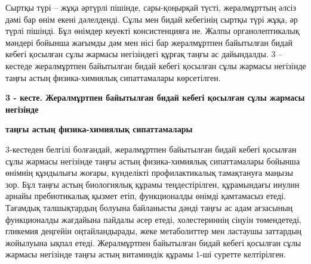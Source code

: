 Сыртқы түрі -- жұқа әртүрлі пішінде, сары-қоңырқай түсті, жералмұрттың
әлсіз дәмі бар өнім екені дәлелденді. Сұлы мен бидай кебегінің сыртқы
түрі жұқа, әр түрлі пішінді. Бұл өнімдер кеуекті консистенцияға ие.
Жалпы органолептикалық мәндері бойынша жағымды дәм мен иісі бар
жералмұртпен байытылған бидай кебегі қосылған сұлы жармасы негізіндегі
құрғақ таңғы ас дайындалды. 3 -- кестеде жералмұртпен байытылған бидай
кебегі қосылған сұлы жармасы негізінде таңғы астың физика-химиялық
сипаттамалары көрсетілген.

{\bfseries 3 - кесте. Жералмұртпен байытылған бидай кебегі қосылған сұлы
жармасы негізінде}

{\bfseries таңғы астың физика-химиялық сипаттамалары}


3-кестеден белгілі болғандай, жералмұртпен байытылған бидай кебегі
қосылған сұлы жармасы негізінде таңғы астың физика-химиялық
сипаттамалары бойынша өнімнің құндылығы жоғары, күнделікті
профилактикалық тамақтануға маңызы зор. Бұл таңғы астың биологиялық
құрамы теңдестірілген, құрамындағы инулин арнайы пребиотикалық қызмет
етіп, функционалды өнімді қамтамасыз етеді. Тағамдық талшықтардың
болуына байланысты дәнді таңғы ас адам ағзасының функционалды жағдайына
пайдалы әсер етеді, холестериннің сіңуін төмендетеді, гликемия деңгейін
оңтайландырады, жеке метаболиттер мен ластаушы заттардың жойылуына ықпал
етеді. Жералмұртпен байытылған бидай кебегі қосылған сұлы жармасы
негізінде таңғы астың витаминдік құрамы 1-ші суретте келтірілген.

